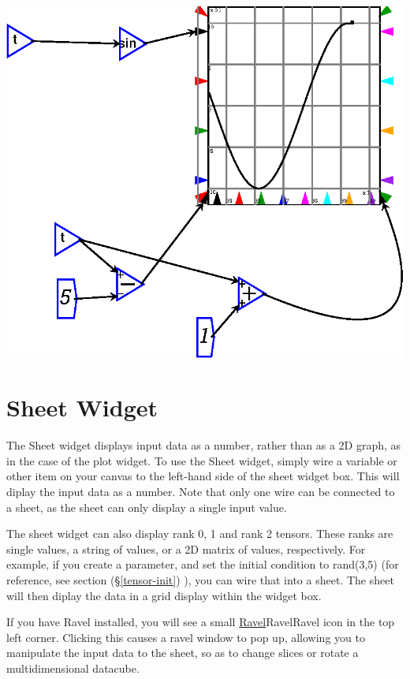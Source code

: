\begin{description}
\begin{center}
  \includegraphics{images/plotSlidingWindow.eps}
\end{center}
\end{description}

\section{Sheet Widget}
\label{Sheet} The Sheet widget displays input data as a number, rather
than as a 2D graph, as in the case of the plot widget.  To use the
Sheet widget, simply wire a variable or other item on your canvas to
the left-hand side of the sheet widget box. This will diplay the input
data as a number. Note that only one wire can be connected to a sheet,
as the sheet can only display a single input value.
 
The sheet widget can also display rank 0, 1 and rank 2 tensors. These
ranks are single values, a string of values, or a 2D matrix of values,
respectively.  For example, if you create a parameter, and set the
initial condition to rand(3,5) (for reference, see section
(\S\ref{tensor-init}) ), you can wire that into a sheet.  The sheet
will then diplay the data in a grid display within the widget box.

If you have Ravel\texttrademark{} installed, you will see a small
\hyperref[ref]{Ravel}{Ravel}{}{Ravel} icon in the top left
corner. Clicking this causes a ravel window to pop up, allowing you to
manipulate the input data to the sheet, so as to change slices or
rotate a multidimensional datacube.
 
